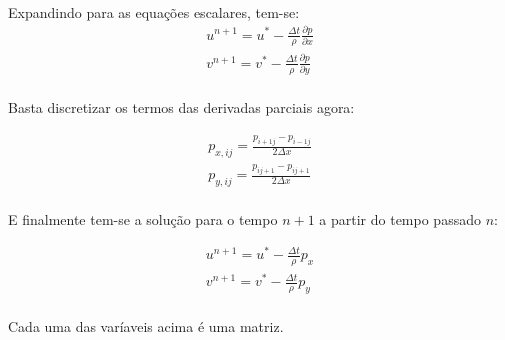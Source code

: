 \documentclass[a4paper,11pt]{article}
\begin{document}
\paragraph{} Expandindo para as equações escalares, tem-se:
\begin{eqnarray}
u^{n+1}=u^*-\frac{\Delta t}{\rho}\frac{\partial p}{\partial x}\\
v^{n+1}=v^*-\frac{\Delta t}{\rho}\frac{\partial p}{\partial y}
\end{eqnarray}
\paragraph{} Basta discretizar os termos das derivadas parciais agora:

\begin{eqnarray}
p_{x,ij}=\frac{p_{i+1j}-p_{i-1j}}{2\Delta x}\\
p_{y,ij}=\frac{p_{ij+1}-p_{ij+1}}{2\Delta x}
\end{eqnarray}

\paragraph{} E finalmente tem-se a solução para o tempo $n+1$ a partir do tempo passado $n$:

\begin{eqnarray}
u^{n+1}=u^*-\frac{\Delta t}{\rho}p_x\\
v^{n+1}=v^*-\frac{\Delta t}{\rho}p_y
\end{eqnarray}
\paragraph{} Cada uma das varíaveis acima é uma matriz.
\end{document}
